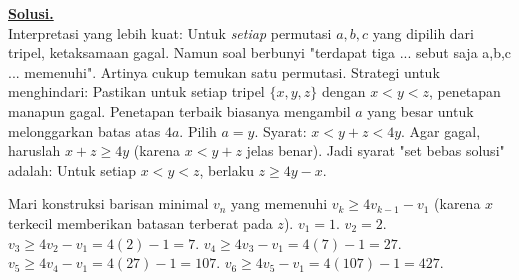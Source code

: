 \documentclass[12pt,twoside]{article}
\newenvironment{solution}
{
	\par\noindent\textbf{\underline{Solusi.}}\\
}
{
	\par
}
\begin{document}
\begin{enumerate}
\begin{solution}
          Interpretasi yang lebih kuat: Untuk \textit{setiap} permutasi $a,b,c$ yang dipilih dari tripel, ketaksamaan gagal.
          Namun soal berbunyi "terdapat tiga ... sebut saja a,b,c ... memenuhi". Artinya cukup temukan satu permutasi.
          Strategi untuk menghindari: Pastikan untuk setiap tripel $\{x, y, z\}$ dengan $x<y<z$, penetapan manapun gagal.
          Penetapan terbaik biasanya mengambil $a$ yang besar untuk melonggarkan batas atas $4a$.
          Pilih $a=y$. Syarat: $x < y+z < 4y$.
          Agar gagal, haruslah $x+z \ge 4y$ (karena $x < y+z$ jelas benar).
          Jadi syarat "set bebas solusi" adalah: Untuk setiap $x<y<z$, berlaku $z \ge 4y - x$.

          Mari konstruksi barisan minimal $v_n$ yang memenuhi $v_k \ge 4v_{k-1} - v_1$ (karena $x$ terkecil memberikan batasan terberat pada $z$).
          $v_1 = 1$.
          $v_2 = 2$.
          $v_3 \ge 4v_2 - v_1 = 4(2) - 1 = 7$.
          $v_4 \ge 4v_3 - v_1 = 4(7) - 1 = 27$.
          $v_5 \ge 4v_4 - v_1 = 4(27) - 1 = 107$.
          $v_6 \ge 4v_5 - v_1 = 4(107) - 1 = 427$.


\end{solution}
\end{enumerate}
\end{document}
